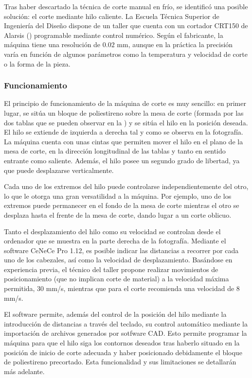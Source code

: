 Tras haber descartado la técnica de corte manual en frío, se identificó una posible solución: el corte mediante hilo caliente. La Escuela Técnica Superior de Ingeniería del Diseño dispone de un taller que cuenta con un cortador CRT150 de Alarsis () programable mediante control numérico. Según el fabricante, la máquina tiene una resolución de $0.02$ mm\cite{ref:crt150}, aunque en la práctica la precisión varía en función de algunos parámetros como la temperatura y velocidad de corte o la forma de la pieza.

\subsubsection{Funcionamiento}
\label{sec:building:technique:functioning}

El principio de funcionamiento de la máquina de corte es muy sencillo: en primer lugar, se sitúa un bloque de poliestireno sobre la mesa de corte (formada por las dos tablas que se pueden observar en la ) y se sitúa el hilo en la posición deseada. El hilo se extiende de izquierda a derecha tal y como se observa en la fotografía. La máquina cuenta con unas cintas que permiten mover el hilo en el plano de la mesa de corte, en la dirección longitudinal de las tablas y tanto en sentido entrante como saliente. Además, el hilo posee un segundo grado de libertad, ya que puede desplazarse verticalmente.

Cada uno de los extremos del hilo puede controlarse independientemente del otro, lo que le otorga una gran versatilidad a la máquina. Por ejemplo, uno de los extremos puede permanecer en el fondo de la mesa de corte mientras el otro se desplaza hasta el frente de la mesa de corte, dando lugar a un corte oblicuo.

Tanto el desplazamiento del hilo como su velocidad se controlan desde el ordenador que se muestra en la parte derecha de la fotografía. Mediante el software CeNeCe Pro 1.12, es posible indicar las distancias a recorrer por cada uno de los cabezales, así como la velocidad de desplazamiento. Basándose en experiencia previa, el técnico del taller propone realizar movimientos de posicionamiento (que no implican corte de material) a la velocidad máxima permitida, 30 mm/s, mientras que para el corte recomienda una velocidad de 8 mm/s.

El software permite, además del control de la posición del hilo mediante la introducción de distancias a través del teclado, su control automático mediante la importación de archivos generados por sotfware CAD. Esto permite programar la máquina para que el hilo siga los contornos deseados tras haberlo situado en la posición de inicio de corte adecuada y haber posicionado debidamente el bloque de poliestireno precortado. Esta funcionalidad y sus limitaciones se detallarán más adelante.

